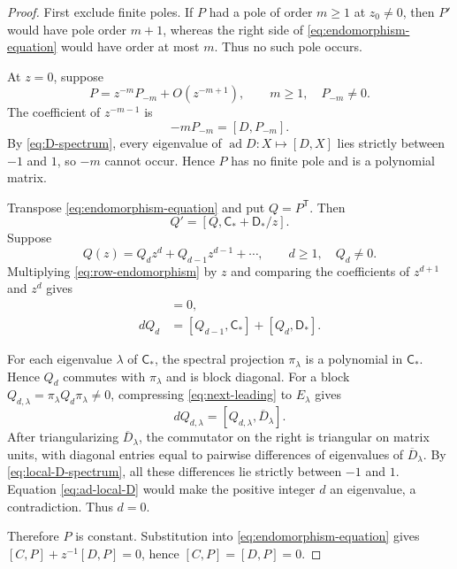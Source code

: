 \documentclass[11pt]{article}
\numberwithin{equation}{section}
\theoremstyle{definition}
\theoremstyle{remark}
\begin{document}
\begin{proof}
First exclude finite poles.  If $P$ had a pole of order $m\ge1$ at
$z_0\ne0$, then $P'$ would have pole order $m+1$, whereas the right side of
\eqref{eq:endomorphism-equation} would have order at most $m$.  Thus no such
pole occurs.

At $z=0$, suppose
\[
  P=z^{-m}P_{-m}+O(z^{-m+1}),
  \qquad m\ge1,
  \quad P_{-m}\ne0.
\]
The coefficient of $z^{-m-1}$ is
\[
  -mP_{-m}=[D,P_{-m}].
\]
By \eqref{eq:D-spectrum}, every eigenvalue of
$\operatorname{ad}D:X\mapsto[D,X]$ lies strictly between $-1$ and $1$, so
$-m$ cannot occur.  Hence $P$ has no finite pole and is a polynomial matrix.

Transpose \eqref{eq:endomorphism-equation} and put $Q=P^{\mathsf T}$.  Then
\begin{equation}\label{eq:row-endomorphism}
  Q'=[Q,\mathsf C_*+\mathsf D_*/z].
\end{equation}
Suppose
\[
  Q(z)=Q_dz^d+Q_{d-1}z^{d-1}+\cdots,
  \qquad d\ge1,
  \quad Q_d\ne0.
\]
Multiplying \eqref{eq:row-endomorphism} by $z$ and comparing the coefficients
of $z^{d+1}$ and $z^d$ gives
\begin{align}
  [Q_d,\mathsf C_*]&=0,\label{eq:leading-commute}\\
  dQ_d&=[Q_{d-1},\mathsf C_*]+[Q_d,\mathsf D_*].
  \label{eq:next-leading}
\end{align}

For each eigenvalue $\lambda$ of $\mathsf C_*$, the spectral projection
$\pi_\lambda$ is a polynomial in $\mathsf C_*$.  Hence $Q_d$ commutes with
$\pi_\lambda$ and is block diagonal.  For a block
$Q_{d,\lambda}=\pi_\lambda Q_d\pi_\lambda\ne0$, compressing
\eqref{eq:next-leading} to $E_\lambda$ gives
\begin{equation}\label{eq:ad-local-D}
  dQ_{d,\lambda}
  =[Q_{d,\lambda},\overline D_\lambda].
\end{equation}
After triangularizing $\overline D_\lambda$, the commutator on the right is
triangular on matrix units, with diagonal entries equal to pairwise
differences of eigenvalues of $\overline D_\lambda$.  By
\eqref{eq:local-D-spectrum}, all these differences lie strictly between
$-1$ and $1$.  Equation \eqref{eq:ad-local-D} would make the positive integer
$d$ an eigenvalue, a contradiction.  Thus $d=0$.

Therefore $P$ is constant.  Substitution into
\eqref{eq:endomorphism-equation} gives
$[C,P]+z^{-1}[D,P]=0$, hence $[C,P]=[D,P]=0$.
\end{proof}
\end{document}
